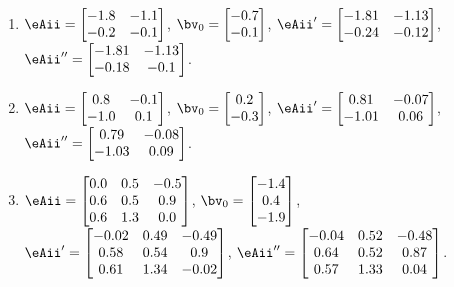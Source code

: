 \begin{exercise}
\begin{enumerate}
\item \(\eAii=\begin{bmatrix} -1.8&-1.1
\\-0.2&-0.1 \end{bmatrix}\),
\(\bv_{\arabic{enumii}}=\begin{bmatrix} -0.7
\\-0.1 \end{bmatrix}\), 
\(\eAii'=\begin{bmatrix} -1.81&-1.13
\\-0.24&-0.12 \end{bmatrix}\),
\(\eAii''=\begin{bmatrix} -1.81&-1.13
\\-0.18&-0.1 \end{bmatrix}\).

\item \(\eAii=\begin{bmatrix} 0.8&-0.1
\\-1.0&0.1 \end{bmatrix}\),
\(\bv_{\arabic{enumii}}=\begin{bmatrix} 0.2
\\-0.3 \end{bmatrix}\), 
\(\eAii'=\begin{bmatrix} 0.81&-0.07
\\-1.01&0.06 \end{bmatrix}\),
\(\eAii''=\begin{bmatrix} 0.79&-0.08
\\-1.03&0.09 \end{bmatrix}\).

\item \(\eAii=\begin{bmatrix} 0.0&0.5&-0.5
\\0.6&0.5&0.9
\\0.6&1.3&0.0 \end{bmatrix}\),
\(\bv_{\arabic{enumii}}=\begin{bmatrix} -1.4
\\0.4
\\-1.9 \end{bmatrix}\), 
\(\eAii'=\begin{bmatrix} -0.02&0.49&-0.49
\\0.58&0.54&0.9
\\0.61&1.34&-0.02 \end{bmatrix}\),
\(\eAii''=\begin{bmatrix} -0.04&0.52&-0.48
\\0.64&0.52&0.87
\\0.57&1.33&0.04 \end{bmatrix}\).


\end{enumerate}
\end{exercise}
